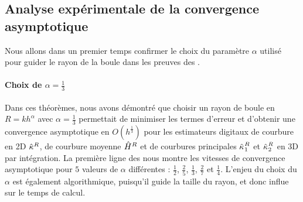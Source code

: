 \subsection{Analyse expérimentale de la convergence asymptotique}
%
Nous allons dans un premier temps confirmer le choix du paramètre $\alpha$
utilisé pour guider le rayon de la boule dans les preuves des
.
%
\paragraph{Choix de $\alpha = \frac{1}{3}$}
%
Dans ces théorèmes, nous avons démontré que choisir un rayon de boule en $R =
kh^\alpha$ avec $\alpha = \frac{1}{3}$ permettait de minimiser les termes
d'erreur et d'obtenir une convergence asymptotique en $O(h^\frac{1}{3})$ pour
les estimateurs digitaux de courbure en 2D $\hat{\kappa}^{R}$, de courbure moyenne
$\hat{H}^{R}$ et de courbures principales $\hat{\kappa_{}}_{1}^{R}$ et
$\hat{\kappa_{}}_{2}^{R}$ en 3D par intégration. La première ligne des
nous montre les vitesses de convergence asymptotique pour $5$ valeurs de
$\alpha$ différentes : $\frac{1}{2}$, $\frac{2}{5}$, $\frac{1}{3}$,
$\frac{2}{7}$ et $\frac{1}{4}$. L'enjeu du choix du $\alpha$ est également
algorithmique, puisqu'il guide la taille du rayon, et donc influe sur le temps
de calcul.


